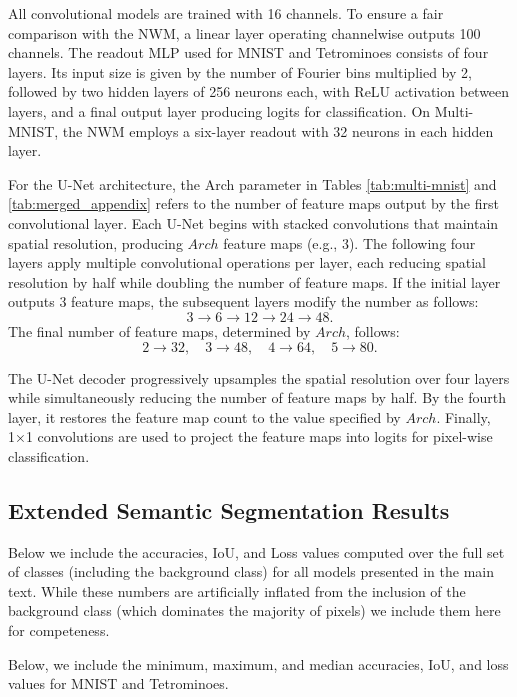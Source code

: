 All convolutional models are trained with 16 channels. To ensure a fair comparison with the NWM, a linear layer operating channelwise outputs 100 channels. The readout MLP used for MNIST and Tetrominoes consists of four layers. Its input size is given by the number of Fourier bins multiplied by 2, followed by two hidden layers of 256 neurons each, with ReLU activation between layers, and a final output layer producing logits for classification. On Multi-MNIST, the NWM employs a six-layer readout with 32 neurons in each hidden layer.

For the U-Net architecture, the Arch parameter in Tables \ref{tab:multi-mnist} and \ref{tab:merged_appendix} refers to the number of feature maps output by the first convolutional layer. Each U-Net begins with stacked convolutions that maintain spatial resolution, producing $Arch$ feature maps (e.g., 3). The following four layers apply multiple convolutional operations per layer, each reducing spatial resolution by half while doubling the number of feature maps. If the initial layer outputs 3 feature maps, the subsequent layers modify the number as follows:
\[
3 \rightarrow 6 \rightarrow 12 \rightarrow 24 \rightarrow 48.
\]
The final number of feature maps, determined by $Arch$, follows:
\[
2 \rightarrow 32, \quad 3 \rightarrow 48, \quad 4 \rightarrow 64, \quad 5 \rightarrow 80.
\]

The U-Net decoder progressively upsamples the spatial resolution over four layers while simultaneously reducing the number of feature maps by half. By the fourth layer, it restores the feature map count to the value specified by $Arch$. Finally, 1×1 convolutions are used to project the feature maps into logits for pixel-wise classification.

\newpage

\subsection{Extended Semantic Segmentation Results}
Below we include the accuracies, IoU, and Loss values computed over the full set of classes (including the background class) for all models presented in the main text. While these numbers are artificially inflated from the inclusion of the background class (which dominates the majority of pixels) we include them here for competeness. 



Below, we include the minimum, maximum, and median accuracies, IoU, and loss values for MNIST and Tetrominoes.



